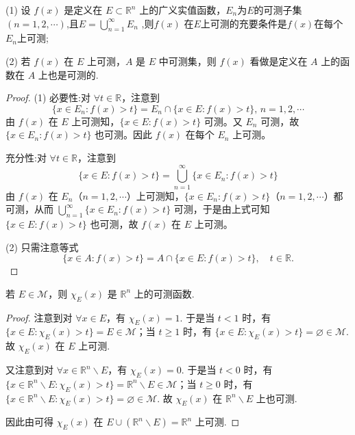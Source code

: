 \documentclass[../../main.tex]{subfiles}
\begin{document}
\begin{theorem}\label{theorem:定理3.3}
(1) 设 \(f(x)\) 是定义在 \(E\subset \mathbb{R}^n\) 上的广义实值函数，$E_n$为$E$的可测子集$(n=1,2,\cdots)$,且$E=\bigcup_{n=1}^{\infty}E_n$ ,则\(f(x)\) 在$E$上可测的充要条件是\(f(x)\)在每个$E_n$上可测;

(2) 若 \(f(x)\) 在 \(E\) 上可测，\(A\) 是 \(E\) 中可测集，则 \(f(x)\) 看做是定义在 \(A\) 上的函数在 \(A\) 上也是可测的.
\end{theorem}
\begin{proof}
(1) {\heiti 必要性:}对 \( \forall t \in \mathbb{R} \)，注意到
\[
\{ x \in E_n : f(x) > t \} = E_n \cap \{ x \in E : f(x) > t \}, \, n = 1, 2, \cdots
\]
由 \( f(x) \) 在 \( E \) 上可测知，\( \{ x \in E : f(x) > t \} \) 可测。又 \( E_n \) 可测，故 \( \{ x \in E_n : f(x) > t \} \) 也可测。因此 \( f(x) \) 在每个 \( E_n \) 上可测。

{\heiti 充分性:}对 \( \forall t \in \mathbb{R} \)，注意到
\[
\{ x \in E : f(x) > t \} = \bigcup_{n = 1}^{\infty} \{ x \in E_n : f(x) > t \}
\]
由 \( f(x) \) 在 \( E_n \)（\( n = 1, 2, \cdots \)）上可测知，\( \{ x \in E_n : f(x) > t \} \)（\( n = 1, 2, \cdots \)）都可测，从而 \( \bigcup_{n = 1}^{\infty} \{ x \in E_n : f(x) > t \} \) 可测，于是由上式可知 \( \{ x \in E : f(x) > t \} \) 也可测，故 \( f(x) \) 在 \( E \) 上可测。

(2) 只需注意等式
\[
\{x \in A: f(x) > t\} = A \cap \{x \in E: f(x) > t\}, \quad t \in \mathbb{R}.
\]
\end{proof}

\begin{proposition}
若 \(E \in \mathscr{M}\)，则 \(\chi_E(x)\) 是 \(\mathbb{R}^n\) 上的可测函数. 
\end{proposition}
\begin{proof}
注意到对 \(\forall x \in E\)，有 \(\chi_E(x) = 1\). 于是当 \(t < 1\) 时，有 \(\{x \in E: \chi_E(x) > t\} = E \in \mathscr{M}\)；当 \(t \geqslant 1\) 时，有 \(\{x \in E: \chi_E(x) > t\} = \varnothing \in \mathscr{M}\). 故 \(\chi_E(x)\) 在 \(E\) 上可测.

又注意到对 \(\forall x \in \mathbb{R}^n \backslash E\)，有 \(\chi_E(x) = 0\). 于是当 \(t < 0\) 时，有 \(\{x \in \mathbb{R}^n \backslash E: \chi_E(x) > t\} = \mathbb{R}^n \backslash E \in \mathscr{M}\)；当 \(t \geqslant 0\) 时，有 \(\{x \in \mathbb{R}^n \backslash E: \chi_E(x) > t\} = \varnothing \in \mathscr{M}\). 故 \(\chi_E(x)\) 在 \(\mathbb{R}^n \backslash E\) 上也可测.

因此由可得 \(\chi_E(x)\) 在 \(E \cup (\mathbb{R}^n \backslash E) = \mathbb{R}^n\) 上可测.
\end{proof}
\end{document}
